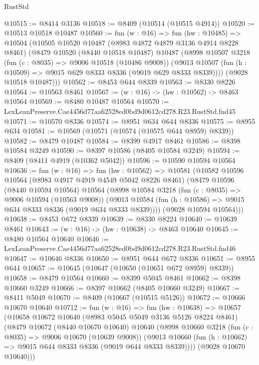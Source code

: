 \begin{lexlean}{RustStd}
\begin{coremodule}
@10515 := @8414 @3136
@10518 := @8409 (@10514 (@10515 @4914))
@10520 := @10513 @10518 @10487
@10560 := fun (w : @16) =>
  fun (hw : @10485) =>
  @10504
    (@10505
      @10520
      @10487
      (@8983 @4872 @4879 @3136 @4914 @8228 @8461)
      (@8479
        @10520
        (@8440 @10518 @10487)
        @10487
        (@8998
          @10507
          @3218
          (fun (c : @8035) => @9006 @10518 (@10486 @9008))
          (@9013 @10507 (fun (h : @10509) => @9015 @629 @8333 @8336 (@9019 @629 @8333 @8339))))
        (@9028 @10518 @10487)))
@10562 := @8453 @644 @8339
@10563 := @8330 @8226
@10564 := @10563 @8461
@10567 := (w : @16) -> (hw : @10562) -> @8463 @10564
@10569 := @8480 @10487 @10564
@10570 := LexLeanPreserve.Cae4456d77aa62528ed0bd9d0612cd278.R23.RustStd.fnd45
@10571 := @10570 @8336
@10574 := @8951 @634 @644 @8336
@10575 := @8955 @634
@10581 := @10569 (@10571 (@10574 (@10575 @644 @8959) @8339))
@10582 := @8479 @10487
@10584 := @8399 @4917 @8461
@10586 := @8398 @10584 @3249
@10590 := @8397 @10586 (@8405 @10584 @3249)
@10594 := @8409 (@8411 @4919 (@10362 @5042))
@10596 := @10590 @10594 @10564
@10636 := fun (w : @16) =>
  fun (hw : @10562) =>
  @10581
    (@10582
      @10596
      @10564
      (@8983 @4917 @4919 @4549 @5042 @8226 @8461)
      (@8479
        @10596
        (@8440 @10594 @10564)
        @10564
        (@8998
          @10584
          @3218
          (fun (c : @8035) => @9006 @10594 (@10563 @9008))
          (@9013 @10584 (fun (h : @10586) => @9015 @634 @8333 @8336 (@9019 @634 @8333 @8339))))
        (@9028 @10594 @10564)))
@10638 := @8453 @672 @8339
@10639 := @8330 @8224
@10640 := @10639 @8461
@10643 := (w : @16) -> (hw : @10638) -> @8463 @10640
@10645 := @8480 @10564 @10640
@10646 := LexLeanPreserve.Cae4456d77aa62528ed0bd9d0612cd278.R23.RustStd.fnd46
@10647 := @10646 @8336
@10650 := @8951 @644 @672 @8336
@10651 := @8955 @644
@10657 := @10645 (@10647 (@10650 (@10651 @672 @8959) @8339))
@10658 := @8479 @10564
@10660 := @8399 @5045 @8461
@10662 := @8398 @10660 @3249
@10666 := @8397 @10662 (@8405 @10660 @3249)
@10667 := @8411 @5049
@10670 := @8409 (@10667 (@10515 @5126))
@10672 := @10666 @10670 @10640
@10712 := fun (w : @16) =>
  fun (hw : @10638) =>
  @10657
    (@10658
      @10672
      @10640
      (@8983 @5045 @5049 @3136 @5126 @8224 @8461)
      (@8479
        @10672
        (@8440 @10670 @10640)
        @10640
        (@8998
          @10660
          @3218
          (fun (c : @8035) => @9006 @10670 (@10639 @9008))
          (@9013 @10660 (fun (h : @10662) => @9015 @644 @8333 @8336 (@9019 @644 @8333 @8339))))
        (@9028 @10670 @10640)))

\end{coremodule}
\end{lexlean}
